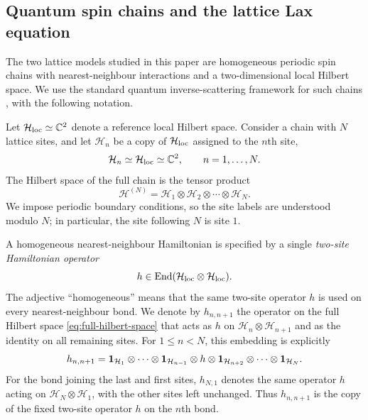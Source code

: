 \subsection{Quantum spin chains and the lattice Lax equation}
\label{sec:quantum-lattice-setup}

The two lattice models studied in this paper are homogeneous periodic spin chains with
nearest-neighbour interactions and a two-dimensional local Hilbert space.  We
use the standard quantum inverse-scattering framework for such chains
\cite{Faddeev1996,AvanDoikouSfetsos2010}, with the following notation.

Let $\mathcal H_{\rm loc}\simeq\mathbb C^2$ denote a reference local Hilbert
space.  Consider a chain with $N$ lattice sites, and let $\mathcal H_n$ be a
copy of $\mathcal H_{\rm loc}$ assigned to the $n$th site,
\begin{equation}
\mathcal H_n \simeq \mathcal H_{\rm loc} \simeq \mathbb C^2,
\qquad n=1,\ldots,N.
\label{eq:local-hilbert-space}
\end{equation}
The Hilbert space of the full chain is the tensor product
\begin{equation}
\mathcal H^{(N)}
 = \mathcal H_1\otimes\mathcal H_2\otimes\cdots\otimes\mathcal H_N.
\label{eq:full-hilbert-space}
\end{equation}
We impose periodic boundary conditions, so the site labels are understood
modulo $N$; in particular, the site following $N$ is site $1$.

A homogeneous nearest-neighbour Hamiltonian is specified by a single
\emph{two-site Hamiltonian operator}
\begin{equation}
h\in \operatorname{End}(\mathcal H_{\rm loc}\otimes\mathcal H_{\rm loc}).
\label{eq:two-site-hamiltonian}
\end{equation}
The adjective ``homogeneous'' means that the same two-site operator $h$ is
used on every nearest-neighbour bond.  We denote by $h_{n,n+1}$ the operator
on the full Hilbert space \eqref{eq:full-hilbert-space} that acts as $h$ on
\(\mathcal H_n\otimes\mathcal H_{n+1}\) and as the identity on all remaining
sites.  For $1\leq n<N$, this embedding is explicitly
\begin{equation}
h_{n,n+1}
 = \mathbf{1}_{\mathcal H_1}\otimes\cdots\otimes
   \mathbf{1}_{\mathcal H_{n-1}}\otimes h\otimes
   \mathbf{1}_{\mathcal H_{n+2}}\otimes\cdots\otimes
   \mathbf{1}_{\mathcal H_N}.
\label{eq:embedded-two-site-hamiltonian}
\end{equation}
For the bond joining the last and first sites, $h_{N,1}$ denotes the same
operator $h$ acting on \(\mathcal H_N\otimes\mathcal H_1\), with the other
sites left unchanged.  Thus $h_{n,n+1}$ is the copy of the fixed two-site
operator $h$ on the $n$th bond.

